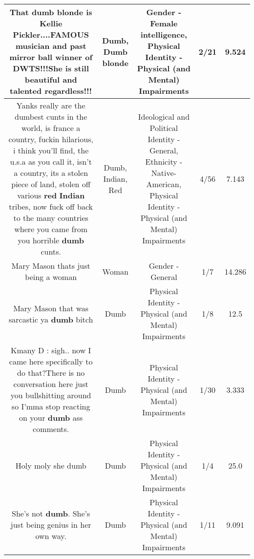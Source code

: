 \documentclass[11pt]{article}
\newlength\mylength
\begin{document}
\begin{center}
\begin{longtable}{|C{.65\mylength}|C{.30\mylength}|C{.12\mylength}|C{.12\mylength}|C{.12\mylength}|}
  \small That \textbf{d\textbf{umb} blonde} is Kellie Pickler....FAMOUS musician and past mirror ball winner of DWTS!!!She is still beautiful and talented regardless!!!\normalsize   & Dumb, Dumb blonde & Gender - Female intelligence, Physical Identity - Physical (and Mental) Impairments & 2/21 & 9.524 \\  \hline
  \small Yanks really are the dumbest cunts in the world, is france a country, fuckin hilarious, i think you'll find, the u.s.a as you call it, isn't a country, its a stolen piece of land, stolen off various \textbf{r\textbf{ed}} \textbf{Indian} tribes, now fuck off back to the many countries where you came from you horrible \textbf{dumb} cunts.\normalsize   & Dumb, Indian, Red &  Ideological and Political Identity - General, Ethnicity - Native-American, Physical Identity - Physical (and Mental) Impairments & 4/56 & 7.143 \\  \hline
  \small Mary Mason thats just being a woman\normalsize   & Woman & Gender - General & 1/7 & 14.286 \\  \hline
  \small Mary Mason that was sarcastic ya \textbf{dumb} bitch\normalsize   & Dumb & Physical Identity - Physical (and Mental) Impairments & 1/8 & 12.5 \\  \hline
  \small Kmany D : sigh..  now I came here specifically to do that?There is no conversation here just you bullshitting around so I'mma stop reacting on your \textbf{dumb} ass comments.\normalsize   & Dumb & Physical Identity - Physical (and Mental) Impairments & 1/30 & 3.333 \\  \hline
  \small Holy moly she dumb\normalsize   & Dumb & Physical Identity - Physical (and Mental) Impairments & 1/4 & 25.0 \\  \hline
  \small She's not \textbf{dumb}. She's just being genius in her own way.\normalsize   & Dumb & Physical Identity - Physical (and Mental) Impairments & 1/11 & 9.091 \\  \hline

\end{longtable}
\end{center}
\end{document}
